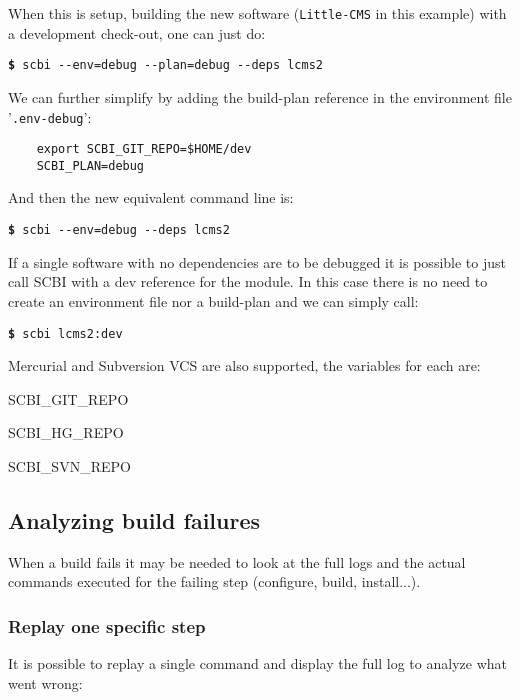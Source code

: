 \documentclass[a4paper,12pt,twoside]{article}
\newcommand{\code}[1]{\texttt{#1}}
\newcommand{\file}[1]{'{\texttt{#1}}'}
\newcommand{\cmd}[1]{\tabto{1cm}\hspace{0.5cm}\texttt{\textbf{\$} #1}}
\newcommand{\ddash}{-{}-}
\begin{document}
When this is setup, building the new software (\code{Little-CMS} in this example) with a development check-out, one can just do:

\cmd{scbi \ddash{}env=debug \ddash{}plan=debug \ddash{}deps lcms2}

We can further simplify by adding the build-plan reference in the environment file \file{.env-debug}:

\begin{lstlisting}
	export SCBI_GIT_REPO=$HOME/dev
	SCBI_PLAN=debug
\end{lstlisting}

And then the new equivalent command line is:

\cmd{scbi \ddash{}env=debug \ddash{}deps lcms2}

If a single software with no dependencies are to be debugged it is possible to just call SCBI with a dev reference for the module. In this case there is no need to create an environment file nor a build-plan and we can simply call:

\cmd{scbi lcms2:dev}

Mercurial and Subversion VCS are also supported, the variables for each are:

\begin{description}[style=standard]
	\item[Git] \tabto{3cm} SCBI\_GIT\_REPO
	\item[Mercurial] \tabto{3cm} SCBI\_HG\_REPO
	\item[Subversion] \tabto{3cm} SCBI\_SVN\_REPO
\end{description}

\subsection{Analyzing build failures}
\label{debugging}

When a build fails it may be needed to look at the full logs and the actual commands executed for the failing step (configure, build, install...).

\subsubsection{Replay one specific step}

It is possible to replay a single command and display the full log to analyze what went wrong:
\end{document}
